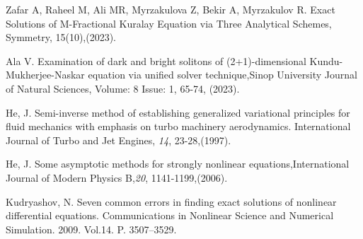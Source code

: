 \documentclass[12pt]{llncs}
\begin{document}
\begin{thebibliography}{9} %
	 Zafar A, Raheel M, Ali MR, Myrzakulova Z, Bekir A, Myrzakulov R. Exact Solutions of M-Fractional Kuralay Equation via Three Analytical Schemes, Symmetry, 15(10),(2023).






		 Ala V.
 Examination of dark and bright solitons of (2+1)-dimensional Kundu-Mukherjee-Naskar equation via unified solver technique,Sinop University Journal of Natural Sciences, Volume: 8 Issue: 1, 65-74,
 (2023).



He, J.   Semi-inverse method of establishing generalized variational principles for fluid mechanics with emphasis on turbo machinery aerodynamics. International Journal of Turbo and Jet Engines, \emph{14}, 23-28,(1997).


He, J.  Some asymptotic methods for strongly nonlinear equations,International Journal of Modern Physics B,\emph{20}, 1141-1199,(2006).


Kudryashov, N.  Seven common errors in finding exact solutions of nonlinear differential equations. Communications in Nonlinear Science and Numerical Simulation. 2009. Vol.{14}. P. 3507--3529.







\end{thebibliography}
\end{document}
